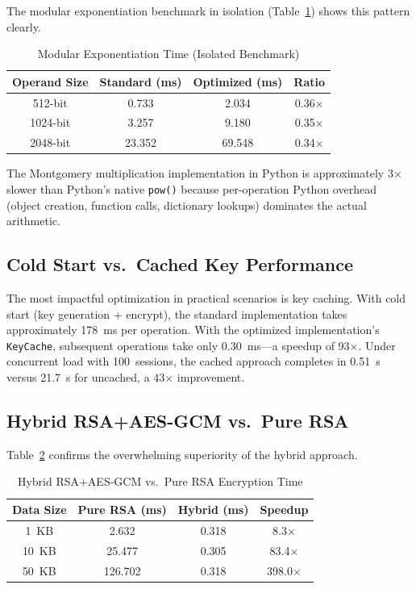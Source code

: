 \documentclass[journal]{IEEEtran}
\begin{document}
The modular exponentiation benchmark in isolation (Table~\ref{tab:modexp}) shows this pattern clearly.

\begin{table}[!t]
\caption{Modular Exponentiation Time (Isolated Benchmark)}
\label{tab:modexp}
\centering
\begin{tabular}{|c|c|c|c|}
\hline
\textbf{Operand Size} & \textbf{Standard (ms)} & \textbf{Optimized (ms)} & \textbf{Ratio} \\
\hline
512-bit & 0.733 & 2.034 & 0.36$\times$ \\
\hline
1024-bit & 3.257 & 9.180 & 0.35$\times$ \\
\hline
2048-bit & 23.352 & 69.548 & 0.34$\times$ \\
\hline
\end{tabular}
\end{table}

The Montgomery multiplication implementation in Python is approximately 3$\times$ slower than Python's native \texttt{pow()} because per-operation Python overhead (object creation, function calls, dictionary lookups) dominates the actual arithmetic.

\subsection{Cold Start vs.\ Cached Key Performance}

The most impactful optimization in practical scenarios is key caching. With cold start (key generation + encrypt), the standard implementation takes approximately 178~ms per operation. With the optimized implementation's \texttt{KeyCache}, subsequent operations take only 0.30~ms---a speedup of 93$\times$. Under concurrent load with 100~sessions, the cached approach completes in 0.51~s versus 21.7~s for uncached, a 43$\times$ improvement.

\subsection{Hybrid RSA+AES-GCM vs.\ Pure RSA}

Table~\ref{tab:hybrid} confirms the overwhelming superiority of the hybrid approach.

\begin{table}[!t]
\caption{Hybrid RSA+AES-GCM vs.\ Pure RSA Encryption Time}
\label{tab:hybrid}
\centering
\begin{tabular}{|c|c|c|c|}
\hline
\textbf{Data Size} & \textbf{Pure RSA (ms)} & \textbf{Hybrid (ms)} & \textbf{Speedup} \\
\hline
1~KB & 2.632 & 0.318 & 8.3$\times$ \\
\hline
10~KB & 25.477 & 0.305 & 83.4$\times$ \\
\hline
50~KB & 126.702 & 0.318 & 398.0$\times$ \\
\hline
\end{tabular}
\end{table}
\end{document}
